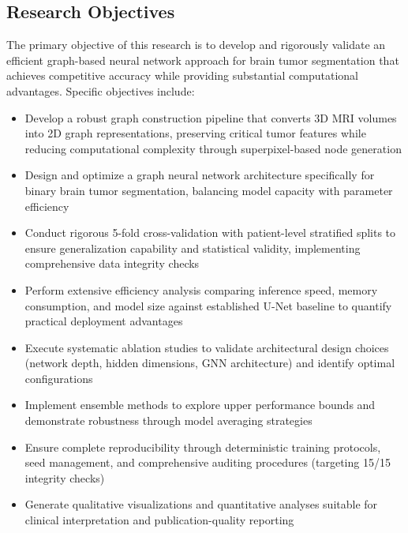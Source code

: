 \subsection{Research Objectives}

The primary objective of this research is to develop and rigorously validate an efficient graph-based neural network approach for brain tumor segmentation that achieves competitive accuracy while providing substantial computational advantages. Specific objectives include:

 \begin{itemize}
    \item Develop a robust graph construction pipeline that converts 3D MRI volumes into 2D graph representations, preserving critical tumor features while reducing computational complexity through superpixel-based node generation
    
    \item Design and optimize a graph neural network architecture specifically for binary brain tumor segmentation, balancing model capacity with parameter efficiency
    
    \item Conduct rigorous 5-fold cross-validation with patient-level stratified splits to ensure generalization capability and statistical validity, implementing comprehensive data integrity checks
    
    \item Perform extensive efficiency analysis comparing inference speed, memory consumption, and model size against established U-Net baseline to quantify practical deployment advantages
    
    \item Execute systematic ablation studies to validate architectural design choices (network depth, hidden dimensions, GNN architecture) and identify optimal configurations
    
    \item Implement ensemble methods to explore upper performance bounds and demonstrate robustness through model averaging strategies
    
    \item Ensure complete reproducibility through deterministic training protocols, seed management, and comprehensive auditing procedures (targeting 15/15 integrity checks)
    
    \item Generate qualitative visualizations and quantitative analyses suitable for clinical interpretation and publication-quality reporting
 \end{itemize}

